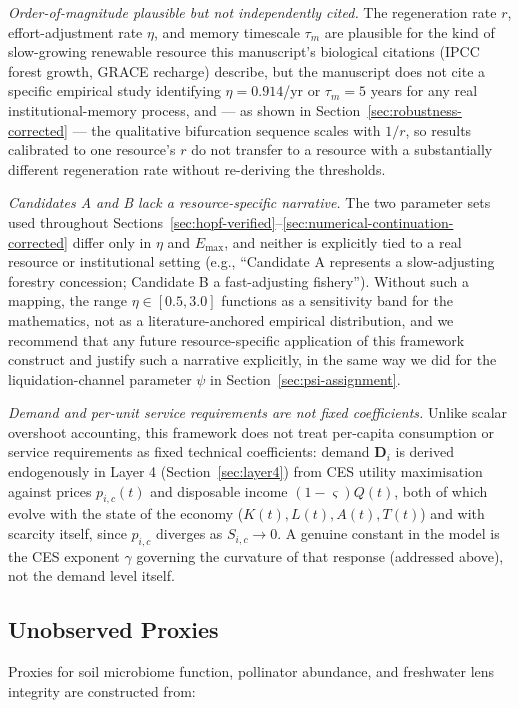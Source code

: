 \documentclass[twocolumn,10pt]{article}
\begin{document}
\emph{Order-of-magnitude plausible but not independently cited.} The regeneration rate $r$, effort-adjustment rate $\eta$, and memory timescale $\tau_m$ are plausible for the kind of slow-growing renewable resource this manuscript's biological citations (IPCC forest growth, GRACE recharge) describe, but the manuscript does not cite a specific empirical study identifying $\eta=0.914$/yr or $\tau_m=5$ years for any real institutional-memory process, and — as shown in Section~\ref{sec:robustness-corrected} — the qualitative bifurcation sequence scales with $1/r$, so results calibrated to one resource's $r$ do not transfer to a resource with a substantially different regeneration rate without re-deriving the thresholds.

\emph{Candidates A and B lack a resource-specific narrative.} The two parameter sets used throughout Sections~\ref{sec:hopf-verified}--\ref{sec:numerical-continuation-corrected} differ only in $\eta$ and $E_{\max}$, and neither is explicitly tied to a real resource or institutional setting (e.g., ``Candidate A represents a slow-adjusting forestry concession; Candidate B a fast-adjusting fishery''). Without such a mapping, the range $\eta\in[0.5,3.0]$ functions as a sensitivity band for the mathematics, not as a literature-anchored empirical distribution, and we recommend that any future resource-specific application of this framework construct and justify such a narrative explicitly, in the same way we did for the liquidation-channel parameter $\psi$ in Section~\ref{sec:psi-assignment}.

\emph{Demand and per-unit service requirements are not fixed coefficients.} Unlike scalar overshoot accounting, this framework does not treat per-capita consumption or service requirements as fixed technical coefficients: demand $\mathbf D_i$ is derived endogenously in Layer 4 (Section~\ref{sec:layer4}) from CES utility maximisation against prices $p_{i,c}(t)$ and disposable income $(1-\varsigma)Q(t)$, both of which evolve with the state of the economy ($K(t), L(t), A(t), T(t)$) and with scarcity itself, since $p_{i,c}$ diverges as $S_{i,c}\to0$. A genuine constant in the model is the CES exponent $\gamma$ governing the curvature of that response (addressed above), not the demand level itself.

\subsection{Unobserved Proxies}
Proxies for soil microbiome function, pollinator abundance, and freshwater lens integrity are constructed from:
\end{document}
